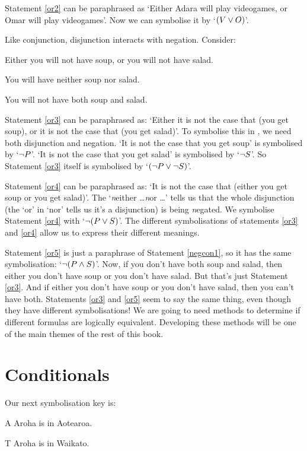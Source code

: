 \documentclass[PHIL101-Textbook.tex]{subfiles}
\begin{document}
\noindent Statement \ref{or2} can be paraphrased as `Either Adara will play videogames, or Omar will play videogames'. Now we can symbolise it by `$(V \vee O)$'.



\noindent Like conjunction, disjunction interacts with negation. Consider:
	\begin{earg}
		\item[\ex{or3}] Either you will not have soup, or you will not have salad.
		\item[\ex{or4}] You will have neither soup nor salad.
		\item[\ex{or5}] You will not have both soup and salad.
	\end{earg}
Statement \ref{or3} can be paraphrased as: `Either it is not the case that (you get soup), or it is not the case that (you get salad)'. To symbolise this in \tfl, we need both disjunction and negation. `It is not the case that you get soup' is symbolised by `$\neg P$'. `It is not the case that you get salad' is symbolised by `$\neg S$'. So Statement \ref{or3} itself is symbolised by `$(\neg P \vee \neg S)$'.

Statement \ref{or4} can be paraphrased as: `It is not the case that (either you get soup or you get salad)'. The `\emph{n}either \ldots \emph{n}or \ldots' tells us that the whole disjunction (the `or' in `nor' tells us it's a disjunction) is being \emph{n}egated. We symbolise Statement \ref{or4} with `$\neg (P \vee S)$'. The different symbolisations of  statements \ref{or3} and \ref{or4} allow us to express their different meanings.

Statement \ref{or5} is just a paraphrase of Statement \ref{negcon1}, so it has the same symbolisation: `$\neg (P \land S)$'. Now, if you don't have both soup and salad, then either you don't have soup or you don't have salad. But that's just Statement \ref{or3}. And if either you don't have soup or you don't have salad, then you can't have both. Statements \ref{or3} and \ref{or5} seem to say the same thing, even though they have different symbolisations! We are going to need methods to determine if different formulas are logically equivalent. Developing these methods will be one of the main themes of the rest of this book.



\section{Conditionals}
Our next symbolisation key is:
\begin{ekey}
\item[A] Aroha is in Aotearoa. 
\item[T] Aroha is in Waikato.
  \end{ekey}
\end{document}
